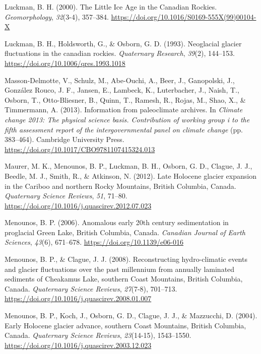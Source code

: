 \documentclass[
  letterpaper,
  DIV=11,
  numbers=noendperiod]{scrartcl}
\newlength{\cslhangindent}
\newlength{\cslentryspacingunit} %
\newenvironment{CSLReferences}[2] %
 {%
  \setlength{\parindent}{0pt}
  \ifodd #1
  \let\oldpar\par
  \def\par{\hangindent=\cslhangindent\oldpar}
  \fi
  \setlength{\parskip}{#2\cslentryspacingunit}
 }%
 {}
\begin{document}
\begin{CSLReferences}{1}{0}
\leavevmode{}%
Luckman, B. H. (2000). {The Little Ice Age in the Canadian Rockies}.
\emph{Geomorphology}, \emph{32}(3-4), 357--384.
\url{https://doi.org/10.1016/S0169-555X(99)00104-X}

\leavevmode{}%
Luckman, B. H., Holdsworth, G., \& Osborn, G. D. (1993). {Neoglacial
glacier fluctuations in the canadian rockies}. \emph{Quaternary
Research}, \emph{39}(2), 144--153.
\url{https://doi.org/10.1006/qres.1993.1018}

\leavevmode{}%
Masson-Delmotte, V., Schulz, M., Abe-Ouchi, A., Beer, J., Ganopolski,
J., González Rouco, J. F., Jansen, E., Lambeck, K., Luterbacher, J.,
Naish, T., Osborn, T., Otto-Bliesner, B., Quinn, T., Ramesh, R., Rojas,
M., Shao, X., \& Timmermann, A. (2013). {Information from paleoclimate
archives}. In \emph{Climate change 2013: The physical science basis.
Contribution of working group i to the fifth assessment report of the
intergovernmental panel on climate change} (pp. 383--464). Cambridge
University Press. \url{https://doi.org/10.1017/CBO9781107415324.013}

\leavevmode{}%
Maurer, M. K., Menounos, B. P., Luckman, B. H., Osborn, G. D., Clague,
J. J., Beedle, M. J., Smith, R., \& Atkinson, N. (2012). {Late Holocene
glacier expansion in the Cariboo and northern Rocky Mountains, British
Columbia, Canada}. \emph{Quaternary Science Reviews}, \emph{51}, 71--80.
\url{https://doi.org/10.1016/j.quascirev.2012.07.023}

\leavevmode{}%
Menounos, B. P. (2006). {Anomalous early 20th century sedimentation in
proglacial Green Lake, British Columbia, Canada}. \emph{Canadian Journal
of Earth Sciences}, \emph{43}(6), 671--678.
\url{https://doi.org/10.1139/e06-016}

\leavevmode{}%
Menounos, B. P., \& Clague, J. J. (2008). {Reconstructing hydro-climatic
events and glacier fluctuations over the past millennium from annually
laminated sediments of Cheakamus Lake, southern Coast Mountains, British
Columbia, Canada}. \emph{Quaternary Science Reviews}, \emph{27}(7-8),
701--713. \url{https://doi.org/10.1016/j.quascirev.2008.01.007}

\leavevmode{}%
Menounos, B. P., Koch, J., Osborn, G. D., Clague, J. J., \& Mazzucchi,
D. (2004). {Early Holocene glacier advance, southern Coast Mountains,
British Columbia, Canada}. \emph{Quaternary Science Reviews},
\emph{23}(14-15), 1543--1550.
\url{https://doi.org/10.1016/j.quascirev.2003.12.023}


\end{CSLReferences}
\end{document}
